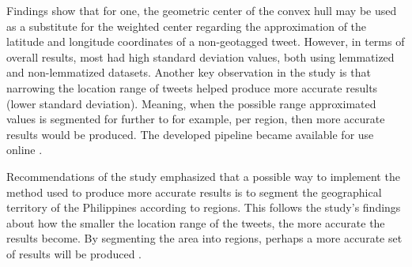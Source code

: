 Findings show that for one, the geometric center of the convex hull may be used as a substitute for the weighted center regarding the approximation of the latitude and longitude coordinates of a non-geotagged tweet. However, in terms of overall results, most had high standard deviation values, both using lemmatized and non-lemmatized datasets. Another key observation in the study is that narrowing the location range of tweets helped produce more accurate results (lower standard deviation). Meaning, when the possible range approximated values is segmented for further to for example, per region, then more accurate results would be produced. The developed pipeline became available for use online \cite{VELASCOBERMEJODOMINGO2018}. 

Recommendations of the study emphasized that a possible way to implement the method used to produce more accurate results is to segment the geographical territory of the Philippines according to regions. This follows the study’s findings about how the smaller the location range of the tweets, the more accurate the results become. By segmenting the area into regions, perhaps a more accurate set of results will be produced \cite{VELASCOBERMEJODOMINGO2018}. 

